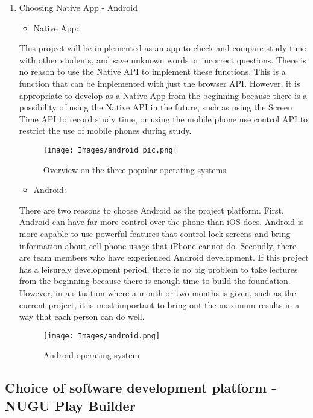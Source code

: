 \documentclass[conference]{IEEEtran}
\begin{document}
\begin{enumerate}
\item Choosing Native App - Android

\begin{itemize}
\item Native App:
\end{itemize}

This project will be implemented as an app to check and compare study time with other students, and save unknown words or incorrect questions. There is no reason to use the Native API to implement these functions. This is a function that can be implemented with just the browser API. However, it is appropriate to develop as a Native App from the beginning because there is a possibility of using the Native API in the future, such as using the Screen Time API to record study time, or using the mobile phone use control API to restrict the use of mobile phones during study.

\begin{figure}[htp]
    \centering
    \texttt{[image: Images/android\_pic.png]}
    \caption{Overview on the three popular operating systems}
\end{figure}

\begin{itemize}
\item Android: 
\end{itemize}

There are two reasons to choose Android as the project platform. First, Android can have far more control over the phone than iOS does. Android is more capable to use powerful features that control lock screens and bring information about cell phone usage that iPhone cannot do. Secondly, there are team members who have experienced Android development. If this project has a leisurely development period, there is no big problem to take lectures from the beginning because there is enough time to build the foundation. However, in a situation where a month or two months is given, such as the current project, it is most important to bring out the maximum results in a way that each person can do well.

\begin{figure}[htp]
    \centering
    \texttt{[image: Images/android.png]}
    \caption{Android operating system}
\end{figure}

\end{enumerate}

\subsection{Choice of software development platform - NUGU Play Builder} 
\end{document}
